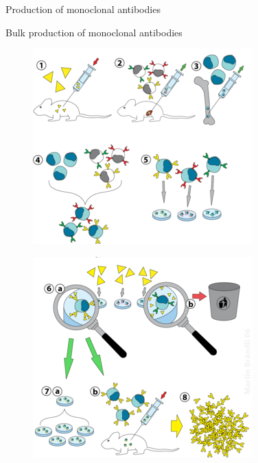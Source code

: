 \begin{frame}{Production of monoclonal antibodies}
    \begin{block}{Bulk production of monoclonal antibodies}
        \vspace{1em}
        \begin{minipage}{0.495\textwidth}
            \begin{figure}
                \centering
                \includegraphics[width=\textwidth]{../Images/hybridoma_1.png}
            \end{figure}  
        \end{minipage}\hfill
        \begin{minipage}{0.495\textwidth}
            \begin{figure}
                \centering
                \includegraphics[width=\textwidth]{../Images/hybridoma_2.png}
            \end{figure}    
        \end{minipage}
    \end{block}
\end{frame}